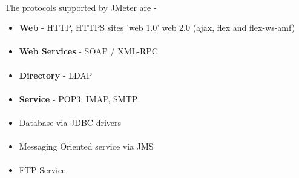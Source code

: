 \documentclass[../thesis.tex]{subfiles}
\begin{document}
\paragraph{}
The protocols supported by JMeter are -

\begin{itemize}
  \item \textbf{Web} - HTTP, HTTPS sites 'web 1.0' web 2.0 (ajax, flex and flex-ws-amf)
  \paragraph{}
  \item \textbf{Web Services} - SOAP / XML-RPC
  \paragraph{}
  \item \textbf{Directory} - LDAP
  \paragraph{}
  \item \textbf{Service} - POP3, IMAP, SMTP
  \paragraph{}
  \item Database via JDBC drivers
  \paragraph{}
  \item Messaging Oriented service via JMS
  \paragraph{}
  \item FTP Service
\end{itemize}
\end{document}
